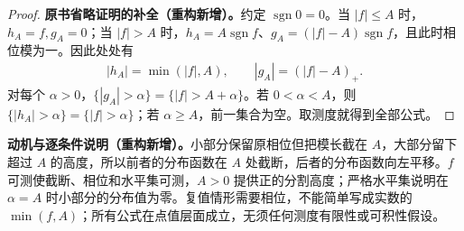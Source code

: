 \documentclass[../../main.tex]{subfiles}
\begin{document}
\begin{proof}
\textbf{原书省略证明的补全（重构新增）。}约定 $\operatorname{sgn}0=0$。当 $|f|\leqslant A$ 时，$h_A=f,g_A=0$；当 $|f|>A$ 时，$h_A=A\operatorname{sgn}f$、$g_A=(|f|-A)\operatorname{sgn}f$，且此时相位模为一。因此处处有
\begin{align*}
|h_A|=\min(|f|,A),\qquad |g_A|=(|f|-A)_+.
\end{align*}
对每个 $\alpha>0$，$\{|g_A|>\alpha\}=\{|f|>A+\alpha\}$。若 $0<\alpha<A$，则 $\{|h_A|>\alpha\}=\{|f|>\alpha\}$；若 $\alpha\geqslant A$，前一集合为空。取测度就得到全部公式。
\end{proof}
\begin{remark}
\textbf{动机与逐条件说明（重构新增）。}小部分保留原相位但把模长截在 $A$，大部分留下超过 $A$ 的高度，所以前者的分布函数在 $A$ 处截断，后者的分布函数向左平移。$f$ 可测使截断、相位和水平集可测，$A>0$ 提供正的分割高度；严格水平集说明在 $\alpha=A$ 时小部分的分布值为零。复值情形需要相位，不能简单写成实数的 $\min(f,A)$；所有公式在点值层面成立，无须任何测度有限性或可积性假设。
\end{remark}

\end{document}
